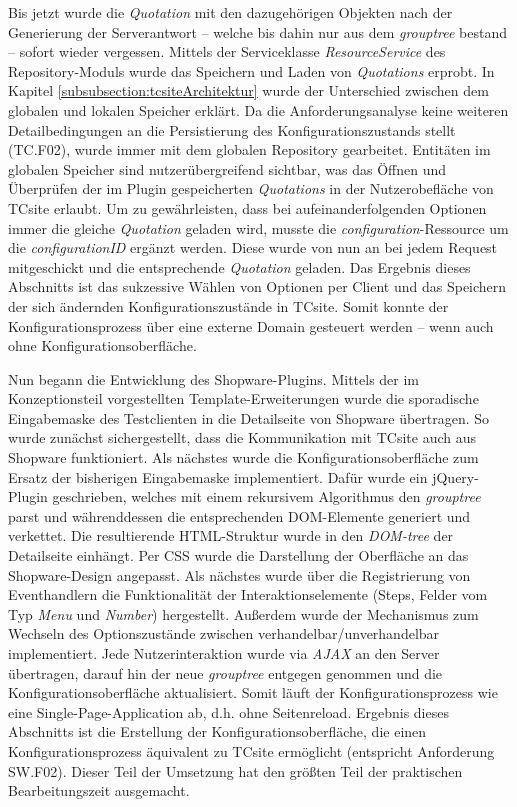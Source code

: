 \documentclass[11pt, a4paper, titlepage, listof=totoc, bibliography=totoc, index=totoc, twoside, openright, headings=normal]{scrreprt}
\begin{document}
Bis jetzt wurde die \emph{Quotation} mit den dazugehörigen Objekten nach der Generierung der Serverantwort -- welche bis dahin nur aus dem \emph{grouptree} bestand -- sofort wieder vergessen. Mittels der Serviceklasse \emph{ResourceService} des Repository-Moduls wurde das Speichern und Laden von \emph{Quotations} erprobt. In Kapitel \ref{subsubsection:tcsiteArchitektur} wurde der Unterschied zwischen dem globalen und lokalen Speicher erklärt. Da die Anforderungsanalyse keine weiteren Detailbedingungen an die Persistierung des Konfigurationszustands stellt (TC.F02), wurde immer mit dem globalen Repository gearbeitet. Entitäten im globalen Speicher sind nutzerübergreifend sichtbar, was das Öffnen und Überprüfen der im Plugin gespeicherten \emph{Quotations} in der Nutzerobefläche von TCsite erlaubt. Um zu gewährleisten, dass bei aufeinanderfolgenden Optionen immer die gleiche \emph{Quotation} geladen wird, musste die \emph{configuration}-Ressource um die \emph{configurationID} ergänzt werden. Diese wurde von nun an bei jedem Request mitgeschickt und die entsprechende \emph{Quotation} geladen. Das Ergebnis dieses Abschnitts ist das sukzessive Wählen von Optionen per Client und das Speichern der sich ändernden Konfigurationszustände in TCsite. Somit konnte der Konfigurationsprozess über eine externe Domain gesteuert werden -- wenn auch ohne Konfigurationsoberfläche.

Nun begann die Entwicklung des Shopware-Plugins. Mittels der im Konzeptionsteil vorgestellten Template-Erweiterungen wurde die sporadische Eingabemaske des Testclienten in die Detailseite von Shopware übertragen. So wurde zunächst sichergestellt, dass die Kommunikation mit TCsite auch aus Shopware funktioniert. Als nächstes wurde die Konfigurationsoberfläche zum Ersatz der bisherigen Eingabemaske implementiert. Dafür wurde ein jQuery-Plugin geschrieben, welches mit einem rekursivem Algorithmus den \emph{grouptree} parst und währenddessen die entsprechenden DOM-Elemente generiert und verkettet. Die resultierende HTML-Struktur wurde in den \emph{DOM-tree} der Detailseite einhängt. Per CSS wurde die Darstellung der Oberfläche an das Shopware-Design angepasst. Als nächstes wurde über die Registrierung von Eventhandlern die Funktionalität der Interaktionselemente (Steps, Felder vom Typ \emph{Menu} und \emph{Number}) hergestellt. Außerdem wurde der Mechanismus zum Wechseln des Optionszustände zwischen verhandelbar/unverhandelbar implementiert. Jede Nutzerinteraktion wurde via \emph{AJAX} an den Server übertragen, darauf hin der neue \emph{grouptree} entgegen genommen und die Konfigurationsoberfläche aktualisiert. Somit läuft der Konfigurationsprozess wie eine Single-Page-Application ab, d.h. ohne Seitenreload. Ergebnis dieses Abschnitts ist die Erstellung der Konfigurationsoberfläche, die einen Konfigurationsprozess äquivalent zu TCsite ermöglicht (entspricht Anforderung SW.F02). Dieser Teil der Umsetzung hat den größten Teil der praktischen Bearbeitungszeit ausgemacht.
\end{document}
